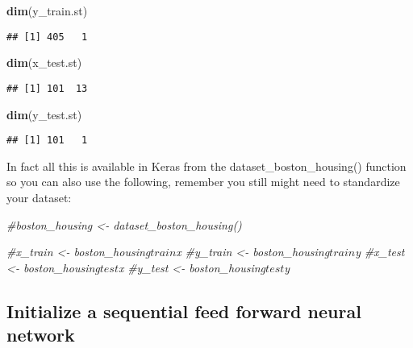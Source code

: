 \documentclass[
]{book}
\newenvironment{Shaded}{\begin{snugshade}}{\end{snugshade}}
\newcommand{\CommentTok}[1]{\textcolor[rgb]{0.56,0.35,0.01}{\textit{#1}}}
\newcommand{\KeywordTok}[1]{\textcolor[rgb]{0.13,0.29,0.53}{\textbf{#1}}}
\newcommand{\NormalTok}[1]{#1}
\begin{document}
\begin{Shaded}
\begin{Highlighting}[]
\KeywordTok{dim}\NormalTok{(y_train.st)}
\end{Highlighting}
\end{Shaded}

\begin{verbatim}
## [1] 405   1
\end{verbatim}

\begin{Shaded}
\begin{Highlighting}[]
\KeywordTok{dim}\NormalTok{(x_test.st)}
\end{Highlighting}
\end{Shaded}

\begin{verbatim}
## [1] 101  13
\end{verbatim}

\begin{Shaded}
\begin{Highlighting}[]
\KeywordTok{dim}\NormalTok{(y_test.st)}
\end{Highlighting}
\end{Shaded}

\begin{verbatim}
## [1] 101   1
\end{verbatim}

In fact all this is available in Keras from the dataset\_boston\_housing() function so you can also use the following, remember you still might need to standardize your dataset:

\begin{Shaded}
\begin{Highlighting}[]
\CommentTok{#boston_housing <- dataset_boston_housing()}

\CommentTok{#x_train <- boston_housing$train$x}
\CommentTok{#y_train <- boston_housing$train$y}
\CommentTok{#x_test <- boston_housing$test$x}
\CommentTok{#y_test <- boston_housing$test$y}
\end{Highlighting}
\end{Shaded}

\hypertarget{initialize-a-sequential-feed-forward-neural-network}{%
\subsection{Initialize a sequential feed forward neural network}\label{initialize-a-sequential-feed-forward-neural-network}}
\end{document}
